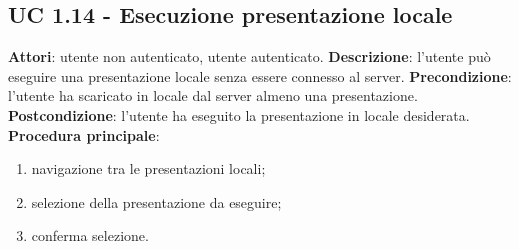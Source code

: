 \subsection{UC 1.14 - Esecuzione presentazione locale}{
\label{uc1.14}
	\textbf{Attori}: utente non autenticato, utente autenticato.
	\textbf{Descrizione}: l'utente può eseguire una presentazione locale senza essere connesso al server.
	\textbf{Precondizione}: l'utente ha scaricato in locale dal server almeno una presentazione.
	\textbf{Postcondizione}: l'utente ha eseguito la presentazione in locale desiderata.
	\textbf{Procedura principale}:
	\begin{enumerate}
		\item navigazione tra le presentazioni locali;
		\item selezione della presentazione da eseguire;
		\item conferma selezione.
	\end{enumerate}
}